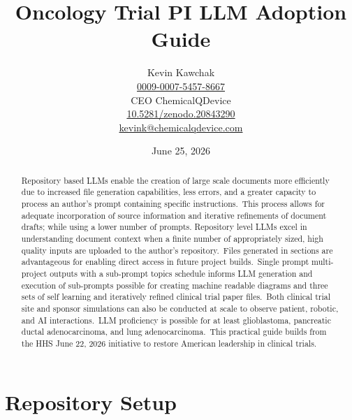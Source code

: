 \documentclass{article}
\title{Oncology Trial PI LLM Adoption Guide}
\author{Kevin Kawchak \\
\href{https://orcid.org/0009-0007-5457-8667}{0009-0007-5457-8667} \\
CEO ChemicalQDevice \\
\href{https://doi.org/10.5281/zenodo.20843290}{10.5281/zenodo.20843290}\\
\href{mailto:kevink@chemicalqdevice.com}{kevink@chemicalqdevice.com}}
\date{June 25, 2026}
\begin{document}
\maketitle

\vspace{-0.75cm}

\begin{abstract}
Repository based LLMs enable the creation of large scale documents more efficiently due to increased file generation capabilities, less errors, and a greater capacity to process an author's prompt containing specific instructions.\ This process allows for adequate incorporation of source information and iterative refinements of document drafts; while using a lower number of prompts. Repository level LLMs excel in understanding document context when a finite number of appropriately sized, high quality inputs are uploaded to the author's repository.\ Files generated in sections are advantageous for enabling direct access in future project builds.\ Single prompt multi-project outputs with a sub-prompt
topics schedule informs LLM generation and execution of sub-prompts possible for creating machine readable diagrams and three sets of self learning and iteratively refined clinical trial paper files.\ Both clinical trial site and sponsor simulations can also be conducted at scale to observe patient, robotic, and AI interactions.\ LLM proficiency is possible for at least glioblastoma, pancreatic ductal adenocarcinoma, and lung adenocarcinoma.\ This practical guide builds from the HHS June 22, 2026 initiative to restore American leadership in clinical trials. \\
\end{abstract}

\vspace{-0.5cm}

\tableofcontents

\vspace{0.1cm}

\section{Repository Setup}
\end{document}
